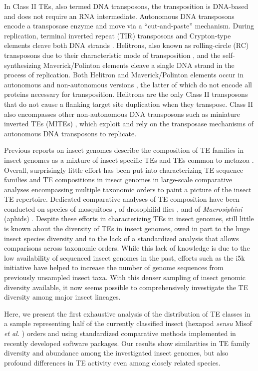 In Class II TEs, also termed DNA transposons, the transposition is
DNA-based and does not require an RNA intermediate. Autonomous DNA
transposons encode a transposase enzyme and move via a ``cut-and-paste''
mechanism. During replication, terminal inverted repeat (TIR)
transposons and Crypton-type elements cleave both DNA strands
\citep{Wicker2007}. Helitrons, also known as rolling-circle (RC)
transposons due to their characteristic mode of transposition
\citep{Kapitonov2001}, and the self-synthesizing Maverick/Polinton
elements \citep{Krupovic2016} cleave a single DNA strand in the process
of replication. Both Helitron and Maverick/Polinton elements occur in
autonomous and non-autonomous versions
\citep{Kapitonov2006,Kapitonov2007}, the latter of which do not encode
all proteins necessary for transposition. Helitrons are the only Class
II transposons that do not cause a flanking target site duplication when
they transpose. Class II also encompasses other non-autonomous DNA
transposons such as miniature inverted TEs (MITEs)
\citep{Shirasawa2012}, which exploit and rely on the transposase
mechanisms of autonomous DNA transposons to replicate.

Previous reports on insect genomes describe the composition of TE
families in insect genomes as a mixture of insect specific TEs and TEs
common to metazoa \citep{Feschotte2007,Maumus2015,Chuong2016}. Overall,
surprisingly little effort has been put into characterizing TE sequence
families and TE compositions in insect genomes in large-scale
comparative analyses encompassing multiple taxonomic orders to paint a
picture of the insect TE repertoire. Dedicated comparative analyses of
TE composition have been conducted on species of mosquitoes
\citep{Neafsey2015}, of drosophilid flies \citep{Sessegolo2016}, and of
\emph{Macrosiphini} (aphids) \citep{Bouallegue2017}. Despite these
efforts in characterizing TEs in insect genomes, still little is known
about the diversity of TEs in insect genomes, owed in part to the huge
insect species diversity and to the lack of a standardized analysis that
allows comparisons across taxonomic orders. While this lack of knowledge
is due to the low availability of sequenced insect genomes in the past,
efforts such as the i5k initiative \citep{Robinson2011} have helped to
increase the number of genome sequences from previously unsampled insect
taxa. With this denser sampling of insect genomic diversity available,
it now seems possible to comprehensively investigate the TE diversity
among major insect lineages.

Here, we present the first exhaustive analysis of the distribution of TE
classes in a sample representing half of the currently classified insect
(hexapod \emph{sensu} Misof \emph{et al.} \citep{Misof2014}) orders and
using standardized comparative methods implemented in recently developed
software packages. Our results show similarities in TE family diversity
and abundance among the investigated insect genomes, but also profound
differences in TE activity even among closely related species.


